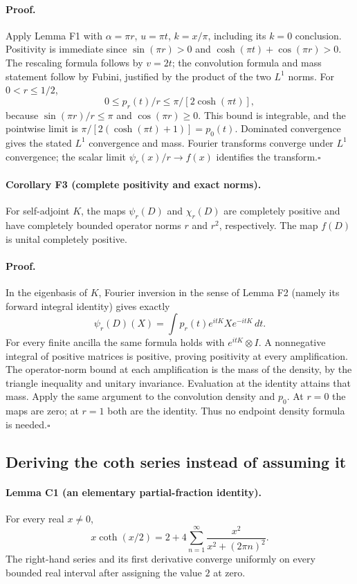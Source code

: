 \paragraph{Proof.}
Apply Lemma F1 with $\alpha=\pi r$, $u=\pi t$, $k=x/\pi$,
including its $k=0$ conclusion. Positivity is immediate since
$\sin(\pi r)>0$ and $\cosh(\pi t)+\cos(\pi r)>0$.
The rescaling formula follows by $v=2t$; the convolution formula and
mass statement follow by Fubini, justified by the product of the two
$L^1$ norms. For $0<r\leq1/2$,
\[
 0\leq p_r(t)/r\leq\pi/[2\cosh(\pi t)],
\]
because $\sin(\pi r)/r\leq\pi$ and $\cos(\pi r)\geq0$.
This bound is integrable, and the pointwise limit is
$\pi/[2(\cosh(\pi t)+1)]=p_0(t)$.
Dominated convergence gives the stated $L^1$ convergence and mass.
Fourier transforms converge under $L^1$ convergence; the scalar limit
$\psi_r(x)/r\to f(x)$ identifies the transform.\hfill$\square$

\paragraph{Corollary F3 (complete positivity and exact norms).}
For self-adjoint $K$, the maps $\psi_r(D)$ and $\chi_r(D)$ are
completely positive and have completely bounded operator norms $r$ and
$r^2$, respectively. The map $f(D)$ is unital completely positive.

\paragraph{Proof.}
In the eigenbasis of $K$, Fourier inversion in the sense of Lemma F2
(namely its forward integral identity) gives exactly
\[
 \psi_r(D)(X)=\int p_r(t)e^{itK}Xe^{-itK}\,dt.
\]
For every finite ancilla the same formula holds with
$e^{itK}\otimes I$. A nonnegative integral of positive matrices is
positive, proving positivity at every amplification. The operator-norm
bound at each amplification is the mass of the density, by the triangle
inequality and unitary invariance. Evaluation at the identity attains
that mass. Apply the same argument to the convolution density and $p_0$.
At $r=0$ the maps are zero; at $r=1$ both are the identity. Thus no
endpoint density formula is needed.\hfill$\square$

\subsection{Deriving the coth series instead of assuming it}

\paragraph{Lemma C1 (an elementary partial-fraction identity).}
For every real $x\ne0$,
\begin{equation}
 x\coth(x/2)=2+4\sum_{n=1}^\infty
                         \frac{x^2}{x^2+(2\pi n)^2}.
 \label{urgent:coth-series}
\end{equation}
The right-hand series and its first derivative converge uniformly on
every bounded real interval after assigning the value $2$ at zero.

